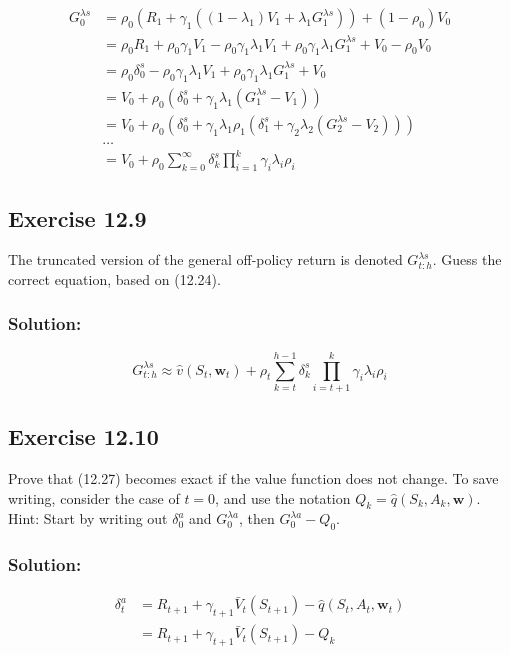 \begin{align*}
    G_0^{\lambda s} &= \rho_0 \left( R_{1} + \gamma_{1} \left( (1 - \lambda_{1}) V_{1} + \lambda_{1} G_{1}^{\lambda s} \right) \right) + (1 - \rho_0) V_0 \\
    &= \rho_0 R_1 + \rho_0 \gamma_1 V_1 - \rho_0 \gamma_1 \lambda_1 V_1 + \rho_0 \gamma_1 \lambda_1 G_1^{\lambda s} + V_0 - \rho_0 V_0 \\
    &= \rho_0  \delta_0^s - \rho_0 \gamma_1 \lambda_1 V_1 + \rho_0 \gamma_1 \lambda_1 G_1^{\lambda s} + V_0  \\
    &= V_0 + \rho_0  \left( \delta_0^s + \gamma_1 \lambda_1 (G_1^{\lambda s} - V_1) \right) \\
    &= V_0 + \rho_0  \left( \delta_0^s + \gamma_1 \lambda_1 \rho_1  \left( \delta_1^s + \gamma_2 \lambda_2 (G_2^{\lambda s} - V_2) \right) \right) \\
    &\dots \\
    &= V_0 + \rho_0 \sum_{k=0}^{\infty} \delta_k^s \prod_{i=1}^{k} \gamma_i \lambda_i \rho_i
\end{align*}


\subsection*{Exercise 12.9}
The truncated version of the general off-policy return is denoted $G_{t:h}^{\lambda s}$.
Guess the correct equation, based on (12.24).

\subsubsection*{Solution:}
\[
    G_{t:h}^{\lambda s} \approx \hat{v}(S_t, \mathbf{w}_t) + \rho_t \sum_{k=t}^{h-1} \delta_k^s \prod_{i=t+1}^{k} \gamma_i \lambda_i \rho_i
\]

\subsection*{Exercise 12.10}
Prove that (12.27) becomes exact if the value function does not change.
To save writing, consider the case of $t = 0$, and use the notation $Q_k = \hat{q}(S_k, A_k, \mathbf{w})$. Hint:
Start by writing out $\delta_0^a$ and $G_0^{\lambda a}$, then $G_0^{\lambda a} - Q_0$.

\subsubsection*{Solution:}
\begin{align*}
    \delta_t^a &= R_{t+1} + \gamma_{t+1} \bar{V}_t(S_{t+1}) - \hat{q}(S_t, A_t, \mathbf{w}_t) \\
    &= R_{t+1} + \gamma_{t+1} \bar{V}_t(S_{t+1}) - Q_k
\end{align*}

